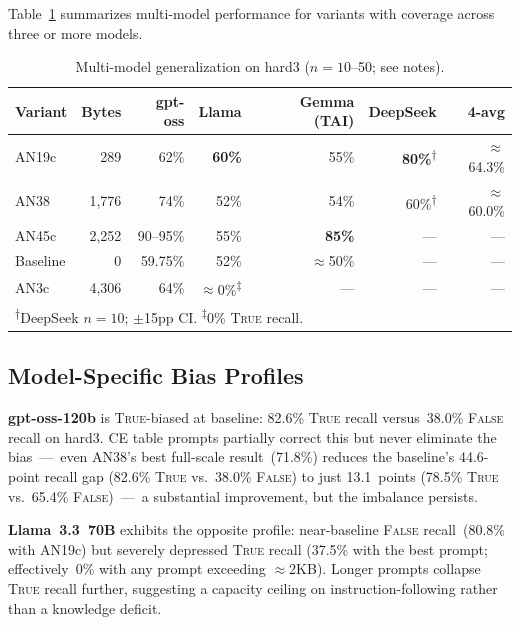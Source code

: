 \documentclass[11pt]{article}
\begin{document}
Table~\ref{tab:multimodel4} summarizes multi-model performance for
variants with coverage across three or more models.

\begin{table}[h]
\centering
\caption{Multi-model generalization on hard3 ($n=10$--50; see notes).}
\label{tab:multimodel4}
\small
\begin{tabular}{lrrrrrr}
\toprule
Variant & Bytes & gpt-oss & Llama & Gemma (TAI) & DeepSeek & 4-avg \\
\midrule
AN19c   & 289   & 62\% & \textbf{60\%} & 55\% & \textbf{80\%}\textsuperscript{$\dagger$} & $\approx$64.3\% \\
AN38    & 1{,}776 & 74\% & 52\% & 54\% & 60\%\textsuperscript{$\dagger$} & $\approx$60.0\% \\
AN45c   & 2{,}252 & 90--95\% & 55\% & \textbf{85\%} & --- & --- \\
Baseline & 0   & 59.75\% & 52\% & $\approx$50\% & --- & --- \\
AN3c    & 4{,}306 & 64\% & $\approx$0\%\textsuperscript{$\ddagger$} & --- & --- & --- \\
\bottomrule
\multicolumn{7}{l}{\textsuperscript{$\dagger$}DeepSeek $n=10$; $\pm$15pp CI.
  \textsuperscript{$\ddagger$}0\% \textsc{True} recall.}
\end{tabular}
\end{table}

\subsection{Model-Specific Bias Profiles}

\textbf{gpt-oss-120b} is \textsc{True}-biased at baseline: 82.6\%
\textsc{True} recall versus~38.0\% \textsc{False} recall on hard3. CE
table prompts partially correct this but never eliminate the bias~---~even
AN38's best full-scale result~(71.8\%) reduces the baseline's 44.6-point
recall gap (82.6\% \textsc{True} vs.\ 38.0\% \textsc{False}) to just
13.1~points (78.5\% \textsc{True} vs.\ 65.4\% \textsc{False})~---~a
substantial improvement, but the imbalance persists.

\textbf{Llama~3.3~70B} exhibits the opposite profile: near-baseline
\textsc{False} recall~(80.8\% with AN19c) but severely depressed
\textsc{True} recall (37.5\% with the best prompt; effectively~0\%
with any prompt exceeding $\approx$2KB). Longer prompts collapse
\textsc{True} recall further, suggesting a capacity ceiling on
instruction-following rather than a knowledge deficit.
\end{document}
